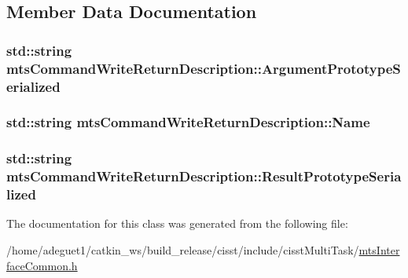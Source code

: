 \subsection{Member Data Documentation}
\hypertarget{classmts_command_write_return_description_ade3f7334194ddd2b58c0d3808ef9f2ff}{
\subsubsection[{Argument\-Prototype\-Serialized}]{\setlength{\rightskip}{0pt plus 5cm}std\-::string mts\-Command\-Write\-Return\-Description\-::\-Argument\-Prototype\-Serialized}}\label{classmts_command_write_return_description_ade3f7334194ddd2b58c0d3808ef9f2ff}
\hypertarget{classmts_command_write_return_description_a16e6828883401087c7e0f17487b5c717}{
\subsubsection[{Name}]{\setlength{\rightskip}{0pt plus 5cm}std\-::string mts\-Command\-Write\-Return\-Description\-::\-Name}}\label{classmts_command_write_return_description_a16e6828883401087c7e0f17487b5c717}
\hypertarget{classmts_command_write_return_description_a37e964f55fdfe2df9b64d3e5767aa23b}{
\subsubsection[{Result\-Prototype\-Serialized}]{\setlength{\rightskip}{0pt plus 5cm}std\-::string mts\-Command\-Write\-Return\-Description\-::\-Result\-Prototype\-Serialized}}\label{classmts_command_write_return_description_a37e964f55fdfe2df9b64d3e5767aa23b}


The documentation for this class was generated from the following file\-:\begin{DoxyCompactItemize}
\item 
/home/adeguet1/catkin\-\_\-ws/build\-\_\-release/cisst/include/cisst\-Multi\-Task/\hyperlink{mts_interface_common_8h}{mts\-Interface\-Common.\-h}\end{DoxyCompactItemize}
